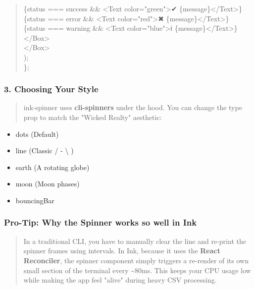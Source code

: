 \begin{quote}
\{status === \textquotesingle success\textquotesingle{} \&\&
\textless Text color="green"\textgreater✔
\{message\}\textless/Text\textgreater\}\\
\{status === \textquotesingle error\textquotesingle{} \&\&
\textless Text color="red"\textgreater✖
\{message\}\textless/Text\textgreater\}\\
\{status === \textquotesingle warning\textquotesingle{} \&\&
\textless Text color="blue"\textgreater ℹ
\{message\}\textless/Text\textgreater\}\\
\textless/Box\textgreater{}\\
\textless/Box\textgreater{}\\
);\\
\};
\end{quote}

\hypertarget{choosing-your-style}{%
\subsubsection{\texorpdfstring{\textbf{3. Choosing Your
Style}}{3. Choosing Your Style}}\label{choosing-your-style}}

\begin{quote}
ink-spinner uses \textbf{cli-spinners} under the hood. You can change
the type prop to match the "Wicked Realty" aesthetic:
\end{quote}

\begin{itemize}
\item
  dots (Default)
\item
  line (Classic / - \textbackslash{} \textbar)
\item
  earth (A rotating globe)
\item
  moon (Moon phases)
\item
  bouncingBar
\end{itemize}

\hypertarget{pro-tip-why-the-spinner-works-so-well-in-ink}{%
\subsubsection{\texorpdfstring{\textbf{Pro-Tip: Why the Spinner works so
well in
Ink}}{Pro-Tip: Why the Spinner works so well in Ink}}\label{pro-tip-why-the-spinner-works-so-well-in-ink}}

\begin{quote}
In a traditional CLI, you have to manually clear the line and re-print
the spinner frames using intervals. In Ink, because it uses the
\textbf{React Reconciler}, the spinner component simply triggers a
re-render of its own small section of the terminal every
\textasciitilde80ms. This keeps your CPU usage low while making the app
feel "alive" during heavy CSV processing.
\end{quote}

